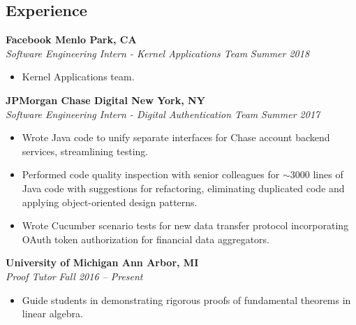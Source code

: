 \documentclass[margin,line]{resume}
\begin{document}
\begin{resume}
	\section{\mysidestyle Experience}
	
	\textbf{Facebook \hfill Menlo Park, CA} \\\vspace{1mm}%
	\textsl{Software Engineering Intern - Kernel Applications Team} \hfill \textsl{Summer 2018}
	\begin{itemize}[leftmargin=4mm]
		\item Kernel Applications team.
	\end{itemize}
	\vspace{-1.5mm}
	
	\textbf{JPMorgan Chase Digital \hfill New York, NY} \\\vspace{1mm}%
	\textsl{Software Engineering Intern - Digital Authentication Team} \hfill \textsl{Summer 2017}
	\begin{itemize}[leftmargin=4mm]
		\item Wrote Java code to unify separate interfaces for Chase account backend services, streamlining testing.
		\item Performed code quality inspection with senior colleagues for $\sim3000$ lines of Java code with suggestions for refactoring, eliminating duplicated code and applying object-oriented design patterns.
		\item Wrote Cucumber scenario tests for new data transfer protocol incorporating OAuth token authorization for financial data aggregators.
	\end{itemize}
	
	\vspace{-1.5mm}
	\textbf{University of Michigan \hfill Ann Arbor, MI} \\\vspace{1mm}%
	\textsl{Proof Tutor} \hfill \textsl{Fall 2016 -- Present}
	\begin{itemize}[leftmargin=4mm]
		\item Guide students in demonstrating rigorous proofs of fundamental theorems in linear algebra.
	\end{itemize}
	\vspace{1.5mm}

	
	\sectionbreak
	\vspace{-2.5mm}

\end{resume}
\end{document}
